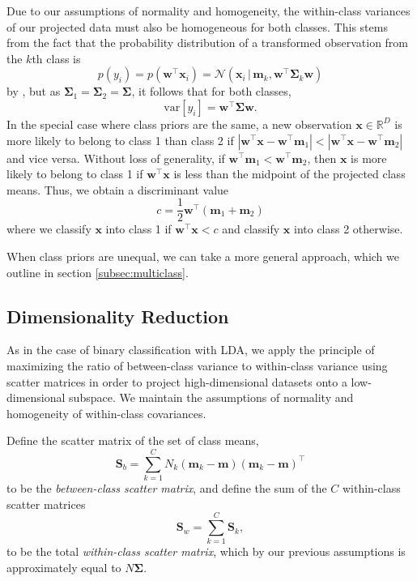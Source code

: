 \documentclass[letterpaper, 10 pt, conference]{ieeeconf}  %
\newcommand{\ve}[1]{\mathbf{#1}}
\begin{document}
Due to our assumptions of normality and homogeneity, the within-class variances of our projected data must also be homogeneous for both classes. This stems from the fact that the probability distribution of a transformed observation from the $k$th class is 
$$p(y_i) = p(\ve{w}^\top \ve{x}_i) = \mathcal{N}(\ve{x}_i\,|\,\ve{m}_k, \ve{w}^\top\ve{\Sigma}_k\ve{w})$$
by \cite{bishop2006pattern}, but as $\ve{\Sigma}_1 = \ve{\Sigma}_2 = \ve{\Sigma}$, it follows that for both classes, $$\text{var}[y_i] = \ve{w}^\top\ve{\Sigma}\ve{w}.$$
In the special case where class priors are the same, a new observation $\ve{x} \in \mathbb{R}^D$ is more likely to belong to class 1 than class 2 if $|\ve{w}^{\top}\ve{x} - \ve{w}^{\top}\ve{m}_1| < |\ve{w}^{\top}\ve{x} - \ve{w}^{\top}\ve{m}_2|$ and vice versa. Without loss of generality, if $\ve{w}^{\top}\ve{m}_1 < \ve{w}^{\top}\ve{m}_2$, then $\ve{x}$ is more likely to belong to class 1 if $\ve{w}^{\top}\ve{x}$ is less than the midpoint of the projected class means. Thus, we obtain a discriminant value $$c = \frac{1}{2}\ve{w}^{\top}(\ve{m}_1+\ve{m}_2)$$ where we classify $\ve{x}$ into class 1 if $\ve{w}^{\top}\ve{x} < c$ and classify $\ve{x}$ into class 2 otherwise.

When class priors are unequal, we can take a more general approach, which we outline in section \ref{subsec:multiclass}.
\subsection{Dimensionality Reduction} \label{subsec:dimreduct}
As in the case of binary classification with LDA, we apply the principle of maximizing the ratio of between-class variance to within-class variance using scatter matrices in order to project high-dimensional datasets onto a low-dimensional subspace.
We maintain the assumptions of normality and homogeneity of within-class covariances. 

Define the scatter matrix of the set of class means, 
$$\ve{S}_b = \sum_{k=1}^C N_k(\ve{m}_k - \ve{m})(\ve{m}_k - \ve{m})^{\top}$$
to be the \textit{between-class scatter matrix}, 
and define the sum of the $C$ within-class scatter matrices
$$\ve{S}_w = \sum_{k=1}^{C} \ve{S}_k,$$
to be the total \textit{within-class scatter matrix}, which by our previous assumptions is approximately equal to $N\ve{\Sigma}.$
\end{document}
